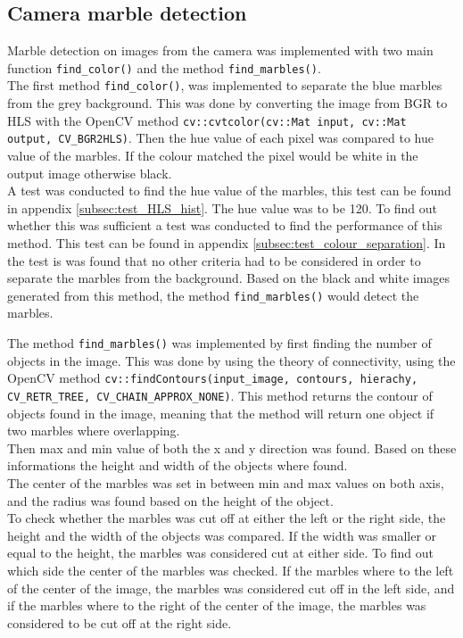 \documentclass[../Head/Main.tex]{subfiles}
\begin{document}
\subsection{Camera marble detection}
Marble detection on images from the camera was implemented with two main function \texttt{find\_color()} and the method \texttt{find\_marbles()}.\\
The first method \texttt{find\_color()}, was implemented to separate the blue marbles from the grey background. This was done by converting the image from BGR to HLS with the OpenCV method \texttt{cv::cvtcolor(cv::Mat input, cv::Mat output, CV\_BGR2HLS)}. Then the hue value of each pixel was compared to hue value of the marbles. If the colour matched the pixel would be white in the output image otherwise black.\\
A test was conducted to find the hue value of the marbles, this test can be found in appendix \ref{subsec:test_HLS_hist}. The hue value was to be 120. To find out whether this was sufficient a test was conducted to find the performance of this method. This test can be found in appendix \ref{subsec:test_colour_separation}. In the test is was found that no other criteria had to be considered in order to separate the marbles from the background. Based on the black and white images generated from this method, the method \texttt{find\_marbles()} would detect the marbles.\par 

The method \texttt{find\_marbles()} was implemented by first finding the number of objects in the image. This was done by using the theory of connectivity, using the OpenCV method \texttt{cv::findContours(input\_image, contours, hierachy, CV\_RETR\_TREE, CV\_CHAIN\_APPROX\_NONE)}. This method returns the contour of objects found in the image, meaning that the method will return one object if two marbles where overlapping.\\
Then max and min value of both the x and y direction was found. Based on these informations the height and width of the objects where found.\\
The center of the marbles was set in between min and max values on both axis, and the radius was found based on the height of the object.\\
To check whether the marbles was cut off at either the left or the right side, the height and the width of the objects was compared. If the width was smaller or equal to the height, the marbles was considered cut at either side. To find out which side the center of the marbles was checked. If the marbles where to the left of the center of the image, the marbles was considered cut off in the left side, and if the marbles where to the right of the center of the image, the marbles was considered to be cut off at the right side.\\
 
\end{document}
